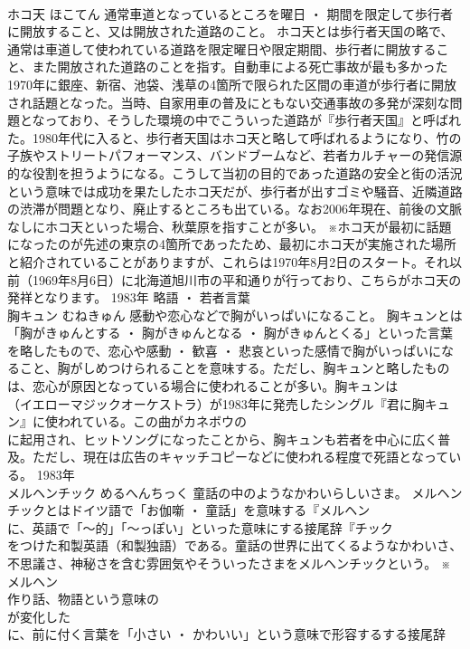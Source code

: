 \documentclass[8pt]{extreport}
\begin{document}
\begin{CJK}{UTF8}{min}
\\	ホコ天	ほこてん	通常車道となっているところを曜日 ・ 期間を限定して歩行者に開放すること、又は開放された道路のこと。	ホコ天とは歩行者天国の略で、通常は車道して使われている道路を限定曜日や限定期間、歩行者に開放すること、また開放された道路のことを指す。自動車による死亡事故が最も多かった1970年に銀座、新宿、池袋、浅草の4箇所で限られた区間の車道が歩行者に開放され話題となった。当時、自家用車の普及にともない交通事故の多発が深刻な問題となっており、そうした環境の中でこういった道路が『歩行者天国』と呼ばれた。1980年代に入ると、歩行者天国はホコ天と略して呼ばれるようになり、竹の子族やストリートパフォーマンス、バンドブームなど、若者カルチャーの発信源的な役割を担うようになる。こうして当初の目的であった道路の安全と街の活況という意味では成功を果たしたホコ天だが、歩行者が出すゴミや騒音、近隣道路の渋滞が問題となり、廃止するところも出ている。なお2006年現在、前後の文脈なしにホコ天といった場合、秋葉原を指すことが多い。 ※ホコ天が最初に話題になったのが先述の東京の4箇所であったため、最初にホコ天が実施された場所と紹介されていることがありますが、これらは1970年8月2日のスタート。それ以前（1969年8月6日）に北海道旭川市の平和通りが行っており、こちらがホコ天の発祥となります。	1983年	略語 ・ 若者言葉	
\\	胸キュン	むねきゅん	感動や恋心などで胸がいっぱいになること。	胸キュンとは「胸がきゅんとする ・ 胸がきゅんとなる ・ 胸がきゅんとくる」といった言葉を略したもので、恋心や感動 ・ 歓喜 ・ 悲哀といった感情で胸がいっぱいになること、胸がしめつけられることを意味する。ただし、胸キュンと略したものは、恋心が原因となっている場合に使われることが多い。胸キュンは
\\	（イエローマジックオーケストラ）が1983年に発売したシングル『君に胸キュン』に使われている。この曲がカネボウの
\\	に起用され、ヒットソングになったことから、胸キュンも若者を中心に広く普及。ただし、現在は広告のキャッチコピーなどに使われる程度で死語となっている。	1983年	
\\	メルヘンチック	めるへんちっく	童話の中のようなかわいらしいさま。	メルヘンチックとはドイツ語で「お伽噺 ・ 童話」を意味する『メルヘン
\\	に、英語で「～的」「～っぽい」といった意味にする接尾辞『チック
\\	をつけた和製英語（和製独語）である。童話の世界に出てくるようなかわいさ、不思議さ、神秘さを含む雰囲気やそういったさまをメルヘンチックという。 ※メルヘン
\\	作り話、物語という意味の 
\\	が変化した 
\\	に、前に付く言葉を「小さい ・ かわいい」という意味で形容するする接尾辞 

\end{CJK}
\end{document}
